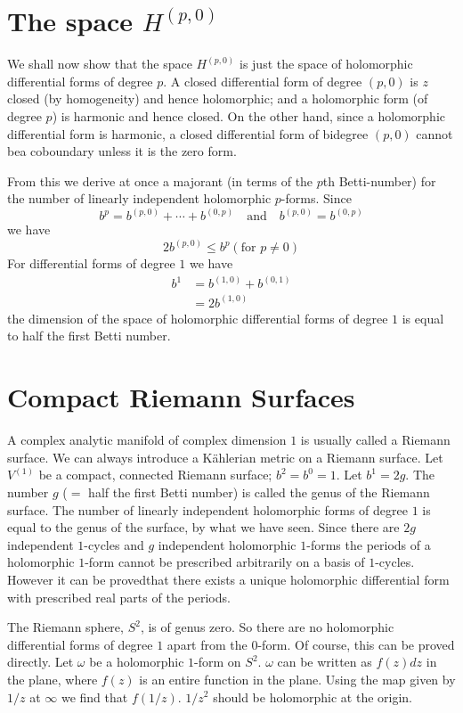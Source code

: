 \section*{The space $H^{(p,0)}$}

We shall now show that the space $H^{(p,0)}$ is just the space of
holomorphic differential forms of degree $p$. A closed differential
form of degree $(p,0)$ is $z$ closed (by homogeneity) and hence
holomorphic; and a holomorphic form (of degree $p$) is harmonic and
hence closed. On the other hand, since a holomorphic differential form
is harmonic, a closed differential form of bidegree $(p,0)$ cannot 
be\pageoriginale a coboundary unless it is the zero form.

From this we derive at once a majorant (in terms of the $p$th
Betti-number) for the number of linearly independent holomorphic
$p$-forms. Since
$$
b^{p}=b^{(p,0)}+\cdots+b^{(0,p)}\quad\text{and}\quad
b^{(p,0)}=b^{(0,p)}
$$
we have
$$
2b^{(p,0)}\leq b^{p}(\text{for } p\neq 0)
$$
For differential forms of degree $1$ we have
\begin{align*}
b^{1} &= b^{(1,0)}+b^{(0,1)}\\
&= 2b^{(1,0)}
\end{align*}
\iec the dimension of the space of holomorphic differential forms of
degree $1$ is equal to half the first Betti number.

\section*{Compact Riemann Surfaces}

A complex analytic manifold of complex dimension $1$ is usually called
a Riemann surface. We can always introduce a K\"ahlerian metric on a
Riemann surface. Let $V^{(1)}$ be a compact, connected Riemann
surface; $b^{2}=b^{0}=1$. Let $b^{1}=2g$. The number $g$ ($=$ half the
first Betti number) is called the genus of the Riemann surface. The
number of linearly independent holomorphic forms of degree $1$ is
equal to the genus of the surface, by what we have seen. Since there
are $2g$ independent $1$-cycles and $g$ independent holomorphic
$1$-forms the periods of a holomorphic $1$-form cannot be prescribed
arbitrarily on a basis of $1$-cycles. However it can be
proved\pageoriginale that there exists a unique holomorphic
differential form with prescribed real parts of the periods.

The Riemann sphere, $S^{2}$, is of genus zero. So there are no
holomorphic differential forms of degree $1$ apart from the
$0$-form. Of course, this can be proved directly. Let $\omega$ be a
holomorphic $1$-form on $S^{2}$. $\omega$ can be written as $f(z)dz$
in the plane, where $f(z)$ is an entire function in the plane. Using
the map given by $1/z$ at $\infty$ we find that $f(1/z)$. $1/z^{2}$
should be holomorphic at the origin.

